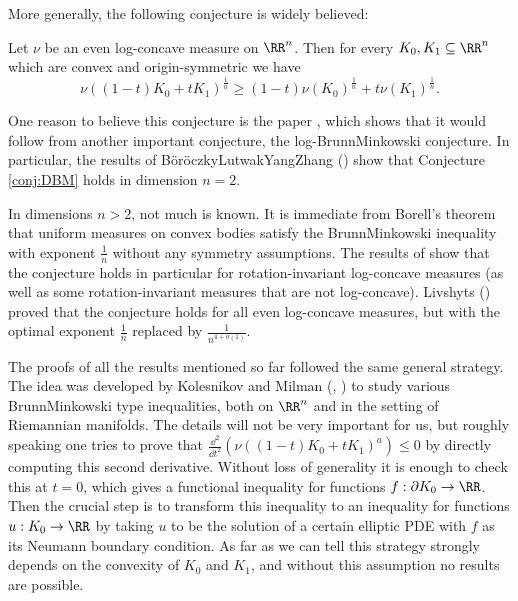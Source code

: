 More generally, the following conjecture is widely believed:
\begin{con}
\label{conj:DBM}Let $\nu$ be an even log-concave measure on $\RR^{n}$.
Then for every $K_{0},K_{1} \subseteq\RR^{n}$ which are convex and origin-symmetric
we have 
\begin{equation}
\nu\left((1-t)K_{0}+t K_{1}\right)^{\frac{1}{n}}\ge(1-t)\nu(K_{0})^{\frac{1}{n}}+ t\nu(K_{1})^{\frac{1}{n}}.
\end{equation}
\end{con}

One reason to believe this conjecture is the paper \cite{LivshytsMarsigliettiNayarZvavitch17},
which shows that it would follow from another important conjecture,
the log-Brunn\textendash Minkowski conjecture. In particular, the
results of Böröczky\textendash Lutwak\textendash Yang\textendash Zhang
(\cite{BoroczkyLutwakYangZhang12}) show that Conjecture \ref{conj:DBM} holds
in dimension $n=2$. 

In dimensions $n>2$, not much is known. It is immediate from Borell's
theorem that uniform measures on convex bodies satisfy the Brunn\textendash Minkowski
inequality with exponent $\frac{1}{n}$ without any symmetry assumptions.
The results of \cite{Cordero-ErasquinRotem23} show that the conjecture
holds in particular for rotation-invariant log-concave measures (as
well as some rotation-invariant measures that are not log-concave). Livshyts
(\cite{Livshyts23}) proved that the conjecture holds for all even
log-concave measures, but with the optimal exponent $\frac{1}{n}$
replaced by $\frac{1}{n^{4+o(1)}}$. 

The proofs of all the results mentioned so far followed the same general
strategy. The idea was developed by Kolesnikov and Milman (\cite{KolesnikovMilman18},
\cite{KolesnikovMilman22}) to study various Brunn\textendash Minkowski
type inequalities, both on $\RR^{n}$ and in the setting of Riemannian
manifolds. The details will not be very important for us, but roughly
speaking one tries to prove that $\frac{\dd^{2}}{\dd t^{2}}\left(\nu\left((1-t)K_{0}+t K_{1}\right)^{a}\right)\le0$
by directly computing this second derivative. Without loss of generality
it is enough to check this at $t=0$, which gives a functional inequality
for functions $f:\partial K_{0} \to\RR$. Then the crucial step is to transform
this inequality to an inequality for functions $u:K_{0} \to\RR$ by taking
$u$ to be the solution of a certain elliptic PDE with $f$ as its
Neumann boundary condition. As far as we can tell this strategy strongly
depends on the convexity of $K_{0}$ and $K_{1}$, and without this assumption
no results are possible. 

